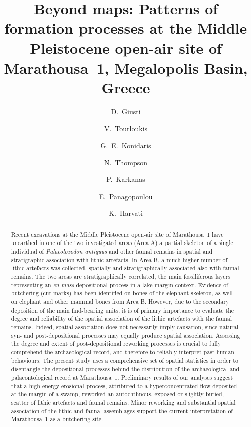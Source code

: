 \documentclass[preprint,authoryear,times]{elsarticle} %
\begin{document}
\begin{frontmatter}
  
  \title{Beyond maps: Patterns of formation processes at the Middle Pleistocene open-air site of Marathousa~1, Megalopolis Basin, Greece}
  
  \author[tue]{D.~Giusti}
  
  \author[tue]{V.~Tourloukis}
  \author[tue]{G.~E.~Konidaris}
  \author[tue]{N.~Thompson}
  \author[wiener]{P.~Karkanas}
  \author[ephoreia]{E.~Panagopoulou}
  \author[tue]{K.~Harvati}
  
  \address[tue]{Paläoanthropologie, Senckenberg Centre for Human Evolution and Palaeoenvironment, Eberhard Karls Universität Tübingen, Rümelinstr. 23, 72070 Tübingen, Germany}
  \address[wiener]{Malcolm H. Wiener Laboratory for Archaeological Science, American School of Classical Studies at Athens, Greece}
  \address[ephoreia]{Ephoreia of Palaeoanthropology-Speleology of Greece, Athens, Greece}

  \begin{abstract}
    Recent excavations at the Middle Pleistocene open-air site of Marathousa~1 have unearthed in one of the two investigated areas (Area A) a partial skeleton of a single individual of \emph{Palaeoloxodon antiquus} and other faunal remains in spatial and stratigraphic association with lithic artefacts. In Area B, a much higher number of lithic artefacts was collected, spatially and stratigraphically associated also with faunal remains. The two areas are stratigraphically correlated, the main fossiliferous layers representing an \emph{en mass} depositional process in a lake margin context. Evidence of butchering (cut-marks) has been identified on bones of the elephant skeleton, as well on elephant and other mammal bones from Area B. However, due to the secondary deposition of the main find-bearing units, it is of primary importance to evaluate the degree and reliability of the spatial association of the lithic artefacts with the faunal remains. Indeed, spatial association does not necessarily imply causation, since natural syn- and post-depositional processes may equally produce spatial association. Assessing the degree and extent of post-depositional reworking processes is crucial to fully comprehend the archaeological record, and therefore to reliably interpret past human behaviours. The present study uses a comprehensive set of spatial statistics in order to disentangle the depositional processes behind the distribution of the archaeological and palaeontological record at Marathousa~1. Preliminary results of our analyses suggest that a high-energy erosional process, attributed to a hyperconcentrated flow deposited at the margin of a swamp, reworked an autochthnous, exposed or slightly buried, scatter of lithic artefacts and faunal remains. Minor reworking and substantial spatial association of the lithic and faunal assemblages support the current interpretation of Marathousa~1 as a butchering site.
  \end{abstract}


\end{frontmatter}
\end{document}
